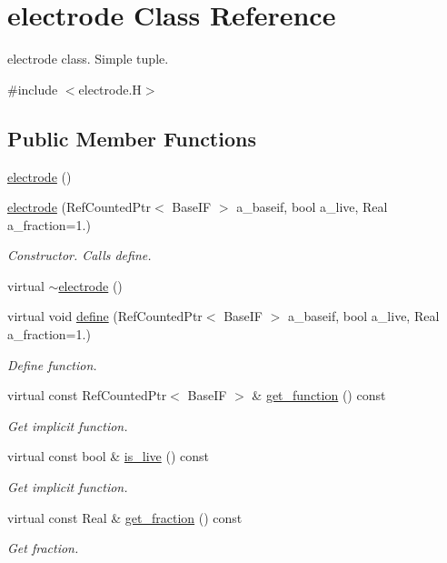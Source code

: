 \hypertarget{classelectrode}{}\section{electrode Class Reference}
\label{classelectrode}


electrode class. Simple tuple.  




{\ttfamily \#include $<$electrode.\+H$>$}

\subsection*{Public Member Functions}
\begin{DoxyCompactItemize}
\item 
\hyperlink{classelectrode_a208aaccf10c1db3f037bb6c4e054db5d}{electrode} ()
\item 
\hyperlink{classelectrode_a4a8391c11111ef24c87a9cdcfdfd6a5c}{electrode} (Ref\+Counted\+Ptr$<$ Base\+IF $>$ a\+\_\+baseif, bool a\+\_\+live, Real a\+\_\+fraction=1.)
\begin{DoxyCompactList}\small\item\em Constructor. Calls define. \end{DoxyCompactList}\item 
virtual \hyperlink{classelectrode_a088c3f2fbfc4b6ee6f64b0c0cdadc8cf}{$\sim$electrode} ()
\item 
virtual void \hyperlink{classelectrode_a749b676bb6b52b2faf383dc4489db779}{define} (Ref\+Counted\+Ptr$<$ Base\+IF $>$ a\+\_\+baseif, bool a\+\_\+live, Real a\+\_\+fraction=1.)
\begin{DoxyCompactList}\small\item\em Define function. \end{DoxyCompactList}\item 
virtual const Ref\+Counted\+Ptr$<$ Base\+IF $>$ \& \hyperlink{classelectrode_a1a7bdd9a2e846f92263c5873ef0d3100}{get\+\_\+function} () const 
\begin{DoxyCompactList}\small\item\em Get implicit function. \end{DoxyCompactList}\item 
virtual const bool \& \hyperlink{classelectrode_a5471f9e508400d26a918b823708b58ae}{is\+\_\+live} () const 
\begin{DoxyCompactList}\small\item\em Get implicit function. \end{DoxyCompactList}\item 
virtual const Real \& \hyperlink{classelectrode_a71716ffe4a4f1c8033312c2983f626f8}{get\+\_\+fraction} () const 
\begin{DoxyCompactList}\small\item\em Get fraction. \end{DoxyCompactList}\end{DoxyCompactItemize}
